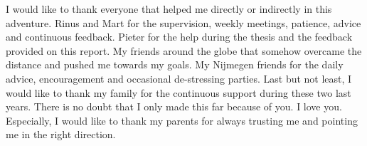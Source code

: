 I would like to thank everyone that helped me directly or indirectly in this adventure. Rinus and Mart for the supervision, weekly meetings, patience, advice and continuous feedback. Pieter for the help during the thesis and the feedback provided on this report. My friends around the globe that somehow overcame the distance and pushed me towards my goals. My Nijmegen friends for the daily advice, encouragement and occasional de-stressing parties. Last but not least, I would like to thank my family for the continuous support during these two last years. There is no doubt that I only made this far because of you. I love you. Especially, I would like to thank my parents for always trusting me and pointing me in the right direction. 

